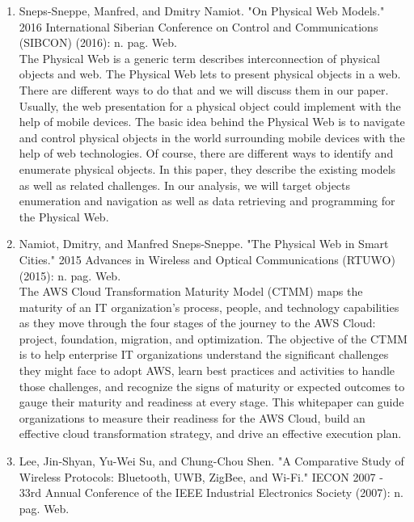 \documentclass[oneside,a4paper,12pt]{report}
\begin{document}
\begin{enumerate}
\item Sneps-Sneppe, Manfred, and Dmitry Namiot. "On Physical Web Models." 2016 International Siberian Conference on Control and Communications (SIBCON) (2016): n. pag. Web.\\
The Physical Web is a generic term describes interconnection of physical objects and web. The Physical Web lets to present physical objects in a web. There are different ways
to do that and we will discuss them in our paper. Usually, the web presentation for a physical object could implement with the help of mobile devices. The basic idea behind the Physical Web is to navigate and control physical objects in the world surrounding
mobile devices with the help of web technologies. Of course, there are different ways to identify and enumerate physical objects. In this paper, they describe the existing models as well as related challenges. In our analysis, we will target objects enumeration
and navigation as well as data retrieving and programming for the Physical Web. \\
\item Namiot, Dmitry, and Manfred Sneps-Sneppe. "The Physical Web in Smart Cities." 2015 Advances in Wireless and Optical Communications (RTUWO) (2015): n. pag. Web.\\
The AWS Cloud Transformation Maturity Model (CTMM) maps the maturity of
an IT organization’s process, people, and technology capabilities as they move
through the four stages of the journey to the AWS Cloud: project, foundation,
migration, and optimization. The objective of the CTMM is to help enterprise IT
organizations understand the significant challenges they might face to adopt
AWS, learn best practices and activities to handle those challenges, and recognize
the signs of maturity or expected outcomes to gauge their maturity and readiness
at every stage. This whitepaper can guide organizations to measure their
readiness for the AWS Cloud, build an effective cloud transformation strategy,
and drive an effective execution plan.\\
\item Lee, Jin-Shyan, Yu-Wei Su, and Chung-Chou Shen. "A Comparative Study of Wireless Protocols: Bluetooth, UWB, ZigBee, and Wi-Fi." IECON 2007 - 33rd Annual Conference of the IEEE Industrial Electronics Society (2007): n. pag. Web.\\

\end{enumerate}
\end{document}
